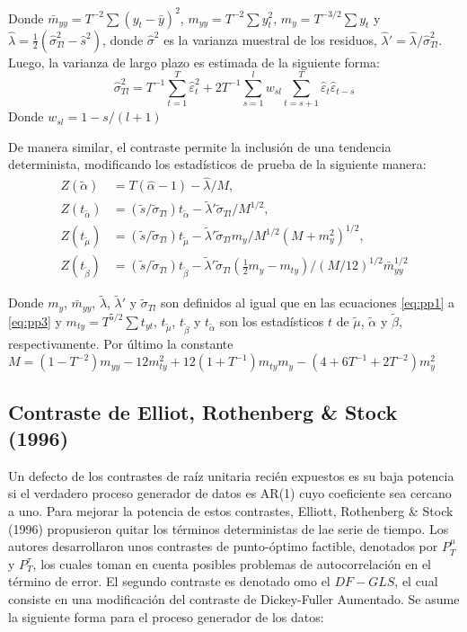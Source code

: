 \documentclass[12pt, twoside]{book}\usepackage[]{graphicx}\usepackage[]{color}
\numberwithin{equation}{section}
\numberwithin{theorem}{section}
\numberwithin{teorema}{section}
\numberwithin{defi}{section}
\numberwithin{prop}{section}
\numberwithin{defi}{section}
\theoremstyle{plain}
\begin{document}
Donde $\bar{m}_{yy}=T^{-2}\sum (y_{t}-\bar{y})^{2}$, $m_{yy}=T^{-2}\sum y_{t}^{2}$, $m_{y}=T^{-3/2}\sum y_{t}$ y $\hat{\lambda} = \frac{1}{2}(\hat{\sigma}^{2}_{Tl}-\hat{s} ^{2})$, donde $\hat{\sigma}^{2}$ es la varianza muestral de los residuos, $\hat{\lambda}'=\hat{\lambda}/\hat{\sigma}^{2}_{Tl}$. Luego, la varianza de largo plazo es estimada de la siguiente forma: 
\begin{equation}
\hat{\sigma}^{2}_{Tl}=T^{-1}\sum_{t=1}^{T}\hat{\varepsilon}_{t}^{2}+2T^{-1}\sum_{s=1}^{l}w_{sl}\sum_{t=s+1}^{T}\hat{\varepsilon}_{t}\hat{\varepsilon}_{t-s}
\end{equation}
Donde $w_{sl}=1-s/(l+1)$

De manera similar, el contraste permite la inclusión de una tendencia determinista, modificando los estadísticos de prueba de la siguiente manera: 
\begin{align}
Z(\tilde{\alpha})  & = T(\hat{\alpha}-1)-\hat{\lambda}/M, \\ 
Z(t_{\tilde{\alpha}}) & = (\tilde{s}/\tilde{\sigma}_{Tl})t_{\tilde{\alpha}}-\tilde{\lambda}'\tilde{\sigma}_{Tl}/M^{1/2}, \\ 
Z(t_{\tilde{\mu}}) & = (\tilde{s}/\tilde{\sigma}_{Tl})t_{\tilde{\mu}}-\tilde{\lambda}'\tilde{\sigma}_{Tl}m_{y}/M^{1/2}(M+m_{y}^{2})^{1/2}, \\
Z(t_{\tilde{\beta}}) & = (\tilde{s}/\tilde{\sigma}_{Tl})t_{\tilde{\beta}}-\tilde{\lambda}'\tilde{\sigma}_{Tl}\left(\frac{1}{2}m_{y}-m_{ty}\right)/(M/12)^{1/2}\bar{m}_{yy}^{1/2}
\end{align}

Donde $m_{y}$, $\bar{m}_{yy}$, $\tilde{\lambda}$, $\tilde{\lambda}'$ y $\tilde{\sigma}_{Tl}$ son definidos al igual que en las ecuaciones \ref{eq:pp1} a \ref{eq:pp3} y $m_{ty}=T^{5/2}\sum t_{yt}$, $t_{\tilde{\mu}}$, $t_{\tilde{\beta}}$ y $t_{\tilde{\alpha}}$ son los estadísticos $t$ de $\tilde{\mu}$, $\tilde{\alpha}$ y $\tilde{\beta}$, respectivamente. Por último la constante $M=(1-T^{-2})m_{yy}-12m^{2}_{ty}+12(1+T^{-1})m_{ty}m_{y}-(4+6T^{-1}+2T^{-2})m_{y}^{2}$

\subsection{Contraste de Elliot, Rothenberg \& Stock (1996)} 

Un defecto de los contrastes de raíz unitaria recién expuestos es su baja potencia si el verdadero proceso generador de datos es AR(1) cuyo coeficiente sea cercano a uno. Para mejorar la potencia de estos contrastes, Elliott, Rothenberg \& Stock (1996) propusieron quitar los términos deterministas de lae  serie de tiempo. Los autores desarrollaron unos contrastes de punto-óptimo factible, denotados por $P^{\mu}_{T}$ y $P^{\tau}_{T}$, los cuales toman en cuenta posibles problemas de autocorrelación en el término de error. El segundo contraste es denotado omo el $DF-GLS$, el cual consiste en una modificación del contraste de Dickey-Fuller Aumentado. Se asume la siguiente forma para el proceso generador de los datos: 
\end{document}
